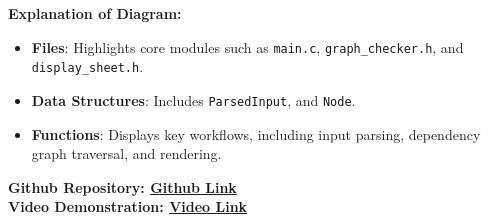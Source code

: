 \documentclass[12pt]{article}
\begin{document}
\textbf{Explanation of Diagram:}
\begin{itemize}
    \item \textbf{Files}: Highlights core modules such as \texttt{main.c}, \texttt{graph\_checker.h}, and \texttt{display\_sheet.h}.
    \item \textbf{Data Structures}: Includes \texttt{ParsedInput}, and \texttt{Node}.
    \item \textbf{Functions}: Displays key workflows, including input parsing, dependency graph traversal, and rendering.
\end{itemize}

\textbf{
Github Repository: \href{https://github.com/ArinjaySinghal19/Spreadsheet-Program.git}{Github Link}
\\
Video Demonstration: \href{https://drive.google.com/file/d/1vTOE9P0J-51jGHLpEHdottVRbZbrOiTq/view?usp=sharing}{Video Link}
}
\end{document}
